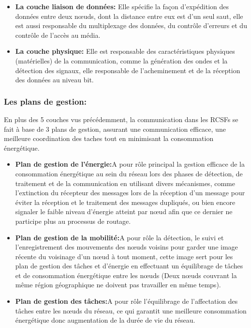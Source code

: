 \begin{itemize}
  \item \textbf{La couche liaison de données:} Elle spécifie la façon d'expédition des données entre deux nœuds, dont la distance entre eux est d'un seul saut, elle est aussi responsable du multiplexage des données, du contrôle d'erreurs et du contrôle de l'accès au média.   \\
  
  \item \textbf{La couche physique:}  Elle est responsable des caractéristiques physiques (matérielles) de la communication, comme la génération des ondes et la détection des signaux, elle responsable de l'acheminement et de la réception des données au niveau bit.   \\ 
\end{itemize}


\subsubsection{Les plans de gestion:}
En plus des 5 couches vus précédemment, la communication dans les RCSFs se fait à base de 3 plans de gestion, assurant une communication efficace, une meilleure coordination des taches tout en minimisant la consommation énergétique.

\begin{itemize}
 \item \textbf{Plan de gestion de l'énergie:}A pour rôle principal la gestion efficace de la consommation énergétique au sein du réseau lors des phases de détection, de traitement et de la communication en utilisant divers mécanismes, comme l'extinction du récepteur des messages lors de la réception d'un message pour éviter la réception et le traitement des messages dupliqués, ou bien encore signaler le faible niveau d'énergie atteint par nœud afin que ce dernier ne participe plus au processus de routage.\\
 
 \item \textbf{Plan de gestion de la mobilité:}A pour rôle la détection, le suivi et l'enregistrement des mouvements des nœuds voisins  pour garder une image récente du voisinage d'un nœud à tout moment, cette image sert pour les plan de gestion des tâches et d'énergie en effectuant un équilibrage de tâches et de consommation énergétique entre les nœuds (Deux nœuds couvrant la même région géographique ne doivent pas travailler en même temps).  \\
 
 \item \textbf{Plan de gestion des tâches:}A pour rôle l'équilibrage de l'affectation des tâches entre les nœuds du réseau, ce qui garantit une meilleure consommation énergétique donc augmentation de la durée de vie du réseau.

\end{itemize}	
   
 
 